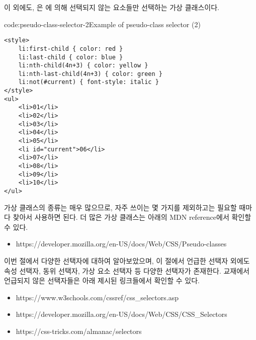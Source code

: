 이 외에도, 은 에 의해 선택되지 않는 요소들만 선택하는 가상 클래스이다.

\begin{code}{code:pseudo-class-selector-2}{Example of pseudo-class selector (2)}
\begin{verbatim}
<style>
    li:first-child { color: red }
    li:last-child { color: blue }
    li:nth-child(4n+3) { color: yellow }
    li:nth-last-child(4n+3) { color: green }
    li:not(#current) { font-style: italic }
</style>
<ul>
    <li>01</li>
    <li>02</li>
    <li>03</li>
    <li>04</li>
    <li>05</li>
    <li id="current">06</li>
    <li>07</li>
    <li>08</li>
    <li>09</li>
    <li>10</li>
</ul>
\end{verbatim}
\end{code}

가상 클래스의 종류는 매우 많으므로, 자주 쓰이는 몇 가지를 제외하고는 필요할 때마다 찾아서 사용하면 된다. 더 많은 가상 클래스는 아래의 MDN reference에서 확인할 수 있다.

\begin{itemize}
    \item https://developer.mozilla.org/en-US/docs/Web/CSS/Pseudo-classes
\end{itemize}

이번 절에서 다양한 선택자에 대하여 알아보았으며, 이 절에서 언급한 선택자 외에도 속성 선택자, 동위 선택자, 가상 요소 선택자 등 다양한 선택자가 존재한다. 교재에서 언급되지 않은 선택자들은 아래 제시된 링크들에서 확인할 수 있다.

\begin{itemize}
    \item https://www.w3schools.com/cssref/css\_selectors.asp
    \item https://developer.mozilla.org/en-US/docs/Web/CSS/CSS\_Selectors
    \item https://css-tricks.com/almanac/selectors
\end{itemize}
